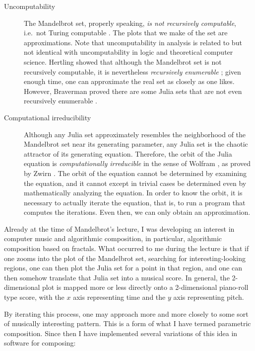 \documentclass[11pt]{scrartcl}
\begin{document}
\begin{description}
\item[Uncomputability] The Mandelbrot set, properly speaking, \emph{is not recursively computable}, i.e.\ not Turing computable \cite{blum1993godel}. The plots that we make of the set are approximations. Note that uncomputability in analysis is related to but not identical with uncomputability in logic and theoretical computer science. Hertling showed that although the  Mandelbrot set is not recursively computable, it is nevertheless \emph{recursively enumerable} \cite{Hertling2005-HERITM-3}; given enough time, one can approximate the real set as closely as one likes. However, Braverman proved there are some Julia sets that are not even recursively enumerable \cite{braverman2006non, braverman2009computability}.
\item[Computational irreducibility] Although any Julia set approximately resembles the neighborhood of the Mandelbrot set near its generating parameter, any Julia set is the chaotic attractor of its generating equation. Therefore, the orbit of the Julia equation is \emph{computationally irreducible} in the sense of Wolfram \cite{wolfram1985undecidability}, as proved by Zwirn \cite{zwirn2015computational}. The orbit of the equation cannot be determined by examining the equation, and it cannot except in trivial cases be determined even by mathematically analyzing the equation. In order to know the orbit, it is necessary to actually iterate the equation, that is, to run a program that computes the iterations. Even then, we can only obtain an approximation.
\end{description}

Already at the time of Mandelbrot's lecture, I was developing an interest in computer music and algorithmic composition, in particular, algorithmic composition based on fractals. What occurred to me during the lecture is that if one zooms into the plot of the Mandelbrot set, searching for interesting-looking regions, one can then plot the Julia set for a point in that region, and one can then somehow translate that Julia set into a musical score. In general, the 2-dimensional plot is mapped more or less directly onto a 2-dimensional piano-roll type score, with the $x$ axis representing time and the $y$ axis representing pitch.

By iterating this process, one may approach more and more closely to some sort of musically interesting pattern. This is a form of what I have termed parametric composition. Since then I have implemented several variations of this idea in software for composing:
\end{document}
